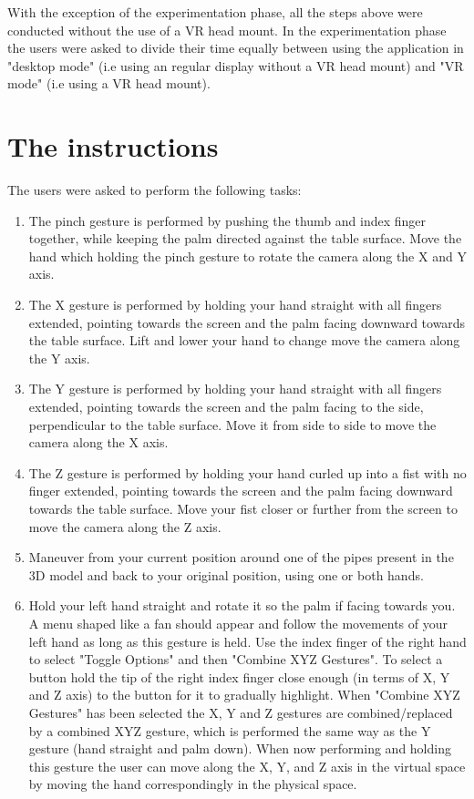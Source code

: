 With the exception of the experimentation phase, all the steps above were conducted without the use of a VR head mount. In the experimentation phase
the users were asked to divide their time equally between using the application in "desktop mode" (i.e using an regular display without a VR head mount) and
"VR mode" (i.e using a VR head mount). 

\section{The instructions}
The users were asked to perform the following tasks:

\begin{enumerate}
    \item The pinch gesture is performed by pushing the thumb and index finger together, while keeping the palm directed against the table surface. 
          Move the hand which holding the pinch gesture to rotate the camera along the X and Y axis.
    
    \item The X gesture is performed by holding your hand straight with all fingers extended, pointing towards the screen and the palm facing downward towards the table surface. 
          Lift and lower your hand to change move the camera along the Y axis. 
    
    \item The Y gesture is performed by holding your hand straight with all fingers extended, pointing towards the screen and the palm facing to the side, 
          perpendicular to the table surface. 
          Move it from side to side to move the camera along the X axis.
    
    \item The Z gesture is performed by holding your hand curled up into a fist with no finger extended, pointing towards the screen and the palm facing downward towards the table surface. 
          Move your fist closer or further from the screen to move the camera along the Z axis. 
    
    \item Maneuver from your current position around one of the pipes present in the 3D model and back to your original position, using one or both hands. 
    
    \item Hold your left hand straight and rotate it so the palm if facing towards you. A menu shaped like a fan should appear and follow the movements of your left hand as long as
          this gesture is held. Use the index finger of the right hand to select "Toggle Options" and then "Combine XYZ Gestures". 
          To select a button hold the tip of the right index finger close enough (in terms of X, Y and Z axis) to the button for it to gradually highlight. 
          When "Combine XYZ Gestures" has been selected the X, Y and Z gestures are combined/replaced by a combined XYZ gesture, which is performed the same way as the Y gesture
          (hand straight and palm down). When now performing and holding this gesture the user can move along the X, Y, and Z axis in the virtual space by moving the hand 
          correspondingly in the physical space.


\end{enumerate}
